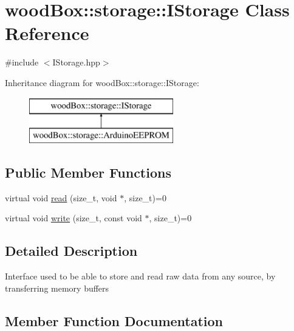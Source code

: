 \hypertarget{classwood_box_1_1storage_1_1_i_storage}{}\section{wood\+Box\+:\+:storage\+:\+:I\+Storage Class Reference}
\label{classwood_box_1_1storage_1_1_i_storage}


{\ttfamily \#include $<$I\+Storage.\+hpp$>$}

Inheritance diagram for wood\+Box\+:\+:storage\+:\+:I\+Storage\+:\begin{figure}[H]
\begin{center}
\leavevmode
\includegraphics[height=2.000000cm]{classwood_box_1_1storage_1_1_i_storage}
\end{center}
\end{figure}
\subsection*{Public Member Functions}
\begin{DoxyCompactItemize}
\item 
virtual void \mbox{\hyperlink{classwood_box_1_1storage_1_1_i_storage_a01bab924be0844e3866b27279caa506d}{read}} (size\+\_\+t, void $\ast$, size\+\_\+t)=0
\item 
virtual void \mbox{\hyperlink{classwood_box_1_1storage_1_1_i_storage_a5eb82c922e8a3147ddab510706be8e24}{write}} (size\+\_\+t, const void $\ast$, size\+\_\+t)=0
\end{DoxyCompactItemize}


\subsection{Detailed Description}
Interface used to be able to store and read raw data from any source, by transferring memory buffers 

\subsection{Member Function Documentation}
\mbox{\label{classwood_box_1_1storage_1_1_i_storage_a01bab924be0844e3866b27279caa506d}} 
